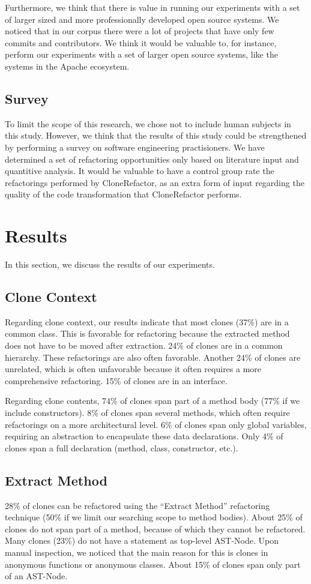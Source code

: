 Furthermore, we think that there is value in running our experiments with a set of larger sized and more professionally developed open source systems. We noticed that in our corpus there were a lot of projects that have only few commits and contributors. We think it would be valuable to, for instance, perform our experiments with a set of larger open source systems, like the systems in the Apache ecosystem.

\subsection{Survey}
To limit the scope of this research, we chose not to include human subjects in this study. However, we think that the results of this study could be strengthened by performing a survey on software engineering practisioners. We have determined a set of refactoring opportunities only based on literature input and quantitive analysis. It would be valuable to have a control group rate the refactorings performed by CloneRefactor, as an extra form of input regarding the quality of the code transformation that CloneRefactor performs.

\section{Results}
In this section, we discuss the results of our experiments.

\subsection{Clone Context}
Regarding clone context, our results indicate that most clones (37\%) are in a common class. This is favorable for refactoring because the extracted method does not have to be moved after extraction. 24\% of clones are in a common hierarchy. These refactorings are also often favorable. Another 24\% of clones are unrelated, which is often unfavorable because it often requires a more comprehensive refactoring. 15\% of clones are in an interface.

Regarding clone contents, 74\% of clones span part of a method body (77\% if we include constructors). 8\% of clones span several methods, which often require refactorings on a more architectural level. 6\% of clones span only global variables, requiring an abstraction to encapsulate these data declarations. Only 4\% of clones span a full declaration (method, class, constructor, etc.).

\subsection{Extract Method}
28\% of clones can be refactored using the ``Extract Method'' refactoring technique (50\% if we limit our searching scope to method bodies). About 25\% of clones do not span part of a method, because of which they cannot be refactored. Many clones (23\%) do not have a statement as top-level AST-Node. Upon manual inspection, we noticed that the main reason for this is clones in anonymous functions or anonymous classes. About 15\% of clones span only part of an AST-Node.

